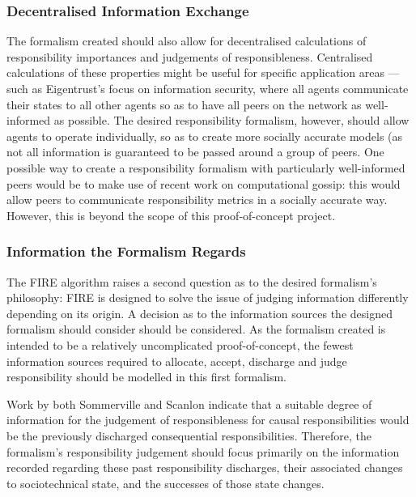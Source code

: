 \subsubsection{Decentralised Information Exchange}
The formalism created should also allow for decentralised calculations of responsibility importances and judgements of responsibleness. Centralised calculations of these properties might be useful for specific application areas --- such as Eigentrust's focus on information security, where all agents communicate their states to all other agents so as to have all peers on the network as well-informed as possible. The desired responsibility formalism, however, should allow agents to operate individually, so as to create more socially accurate models (as not all information is guaranteed to be passed around a group of peers. One possible way to create a responsibility formalism with particularly well-informed peers would be to make use of recent work on computational gossip\cite{Boyd2006,Lavaei2012}: this would allow peers to communicate responsibility metrics in a socially accurate way. However, this is beyond the scope of this proof-of-concept project.\par

\subsubsection{Information the Formalism Regards}
The FIRE algorithm raises a second question as to the desired formalism's philosophy: FIRE is designed to solve the issue of judging information differently depending on its origin. A decision as to the information sources the designed formalism should consider should be considered. As the formalism created is intended to be a relatively uncomplicated proof-of-concept, the fewest information sources required to allocate, accept, discharge and judge responsibility should be modelled in this first formalism.\par

Work by both Sommerville and Scanlon indicate that a suitable degree of information for the judgement of responsibleness for causal responsibilities would be the previously discharged consequential responsibilities. Therefore, the formalism's responsibility judgement should focus primarily on the information recorded regarding these past responsibility discharges, their associated changes to sociotechnical state, and the successes of those state changes.\par

